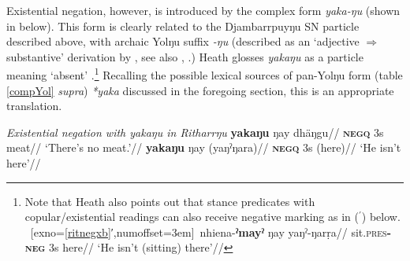 \documentclass[usenames,dvipsnames,11pt]{article}
\begin{document}
{{Existential negation, however, is introduced by the complex form \textit{yaka-ŋu} (shown in \nextx{} below). This form is clearly related to the Djambarrpuyŋu SN particle described above, with archaic Yolŋu suffix {\textit{-ŋu}} (described as an `adjective $\Rightarrow$ substantive' derivation by \citealt[34]{Schebeck2001}, see also \citealt[174ff]{Wilkinson1991}, \citealt[24]{Heath1980}.) Heath glosses \textit{yakaŋu} as a particle meaning `absent' \citeyearpar[102]{Heath1980}.\footnote{Note that Heath also points out that stance predicates with copular/existential readings can also receive negative marking as in ($^\prime$) below. 
	\pex~[exno=\ref{ritnegxb}′,numoffset=3em]~\begingl\gla nhiena-\textbf{ˀmayˀ} ŋay yaŋˀ-ŋarṛa//
	\glb sit\textsc{.pres\textbf{-neg}} 3s here//
	\glft`He isn't (sitting) there'//\endgl \xe
}
Recalling the possible lexical sources of pan-Yolŋu form (table \ref{compYol} \textit{supra}) \textit{*yaka} discussed in the foregoing section, this is an appropriate translation.

\pex\textit{ Existential negation with {\em yakaŋu} in Ritharrŋu}
\a\begingl\gla \textbf{yakaŋu} ŋay dhäŋgu//
\glb\textsc{\textbf{negq}} 3s meat//
\glft`There's no meat.'//
\endgl
\a\label{ritnegxb}\begingl\gla \textbf{yakaŋu} ŋay (yaŋˀŋara)//
\glb \textsc{\textbf{negq}} 3s (here)//
\glft`He isn't here'//\endgl
\xe

}}
\end{document}
